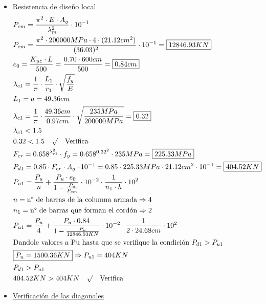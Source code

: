 \begin{itemize}
\item \underline{Resistencia de diseño local}
\begin{align*}
& P_{cm} = \frac{\pi^2 \cdot E \cdot A_g}{\lambda_m^2} \cdot 10^{-1}\\
& P_{cm} = \frac{\pi^2 \cdot 200000MPa \cdot 4 \cdot (21.12cm^2)}{(36.03)^2} \cdot 10^{-1} = \framebox{$12846.93KN$}\\
& e_0 = \frac{K_{yz} \cdot L}{500} = \frac{0.70 \cdot 600cm}{500} = \framebox{$0.84cm$} \\
& \lambda_{c1} = \frac{1}{\pi} \cdot \frac{L_1}{r_1} \cdot \sqrt{\frac{f_y}{E}} \\
& L_1 = a = 49.36cm \\
& \lambda_{c1} = \frac{1}{\pi} \cdot \frac{49.36cm}{0.97cm} \cdot \sqrt{\frac{235MPa}{200000MPa}} = \framebox{$0.32$} \\
& \lambda_{c1} < 1.5 \\
& 0.32 < 1.5 \quad \surd \quad \text{Verifica} \\
& F_{cr} = 0.658^{\lambda_{c1}^2} \cdot f_y = 0.658^{0.32^2} \cdot 235MPa = \framebox{$225.33MPa$}\\
& P_{d1} = 0.85 \cdot F_{cr} \cdot A_g \cdot 10^{-1} = 0.85 \cdot 225.33MPa \cdot 21.12cm^2 \cdot 10^{-1} = \framebox{$404.52KN$} \\
& P_{u1} = \frac{P_u}{n} + \frac{P_u \cdot e_0}{1-\frac{P_u}{P_{cm}}} \cdot 10^{-2} \cdot \frac{1}{n_1 \cdot h} \cdot 10^2 \\
& n = \text{n° de barras de la columna armada} \Rightarrow 4 \\
& n_1 = \text{n° de barras que forman el cordón} \Rightarrow 2 \\
& P_{u1} = \frac{P_u}{4} + \frac{P_u \cdot 0.84}{1-\frac{P_u}{12846.93KN}} \cdot 10^{-2} \cdot \frac{1}{2 \cdot 24.68cm} \cdot 10^2 \\
& \text{Dandole valores a Pu hasta que se verifique la condición } P_{d1} > P_{u1}\\
& \framebox{$P_u = 1500.36KN$} \Rightarrow P_{u1} = 404KN\\
& P_{d1} > P_{u1} \\
& 404.52KN > 404KN \quad \surd \quad \text{Verifica} \\
\end{align*}
\newpage
\item \underline{Verificación de las diagonales}


\end{itemize}
